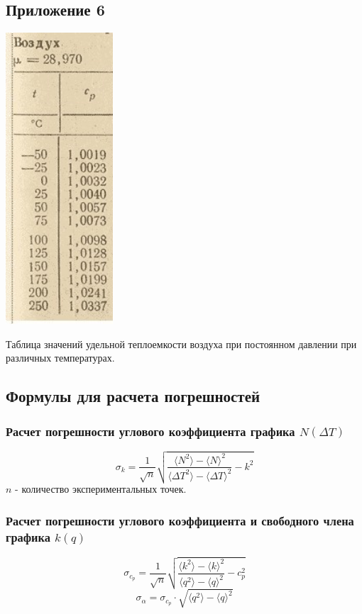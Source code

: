 \subsection{Приложение 6} \label{Приложение 6}
\begin{center}
    \includegraphics[width=0.3\textwidth]{img/ud_teplo.png}
    
    Таблица значений удельной теплоемкости воздуха при постоянном давлении при различных температурах.
\end{center}

\subsection{Формулы для расчета погрешностей}
\subsubsection{Расчет погрешности углового коэффициента графика $N(\Delta T)$}
\[\sigma_k = \frac{1}{\sqrt{n}}\sqrt{\frac{\langle N^2 \rangle - {\langle N \rangle}^2}{\langle \Delta T^2 \rangle - {\langle \Delta T \rangle}^2} - k^2}\] $n$ - количество экспериментальных точек.

\subsubsection{Расчет погрешности углового коэффициента и свободного члена графика $k(q)$}
\[\sigma_{c_p} = \frac{1}{\sqrt{n}}\sqrt{\frac{\langle k^2 \rangle - {\langle k \rangle}^2}{\langle q^2 \rangle - {\langle q \rangle}^2} - c_p^2}\]
\[\sigma_\alpha = \sigma_{c_p} \cdot \sqrt{\langle q^2 \rangle - {\langle q \rangle}^2}\]
